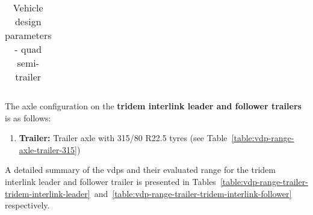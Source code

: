 \begin{table}[H]
\begin{threeparttable}
\begin{tabulary}{\textwidth}{lcccccc}
			\bottomrule
		\end{tabulary}

		\caption{Vehicle design parameters - quad semi-trailer}
		\label{table:vdp-range-trailer-quad-semi}


	\end{threeparttable}
\end{table}
\newpage
The axle configuration on the \textbf{tridem interlink leader and follower trailers} is as follows:

\begin{enumerate}
	\item \textbf{Trailer:} Trailer axle with 315/80 R22.5 tyres (see Table~\ref{table:vdp-range-axle-trailer-315})
\end{enumerate}

A detailed summary of the \glspl{vdp} and their evaluated range for the tridem interlink leader and follower trailer is presented in Tables~\ref{table:vdp-range-trailer-tridem-interlink-leader}~and~\ref{table:vdp-range-trailer-tridem-interlink-follower} respectively.

